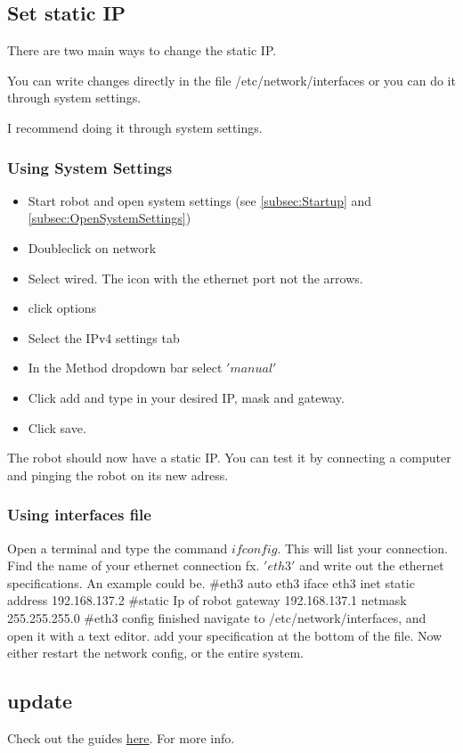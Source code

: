 \documentclass{article}
\begin{document}
\subsection{Set static IP}
There are two main ways to change the static IP. 

You can write changes directly in the file /etc/network/interfaces or you can do it through system settings. 

I recommend doing it through system settings. 

\subsubsection{Using System Settings}
\begin{itemize}
\item Start robot and open system settings (see \ref{subsec:Startup} and \ref{subsec:OpenSystemSettings})
\item Doubleclick on network
\item Select wired. The icon with the ethernet port not the arrows.
\item click options
\item Select the IPv4 settings tab
\item In the Method dropdown bar select $'manual'$ 
\item Click add and type in your desired IP, mask and gateway. 
\item Click save. 
\end{itemize}
The robot should now have a static IP. You can test it by connecting a computer and pinging the robot on its new adress. 

\subsubsection{Using interfaces file}
Open a terminal and type the command $ifconfig$. 
This will list your connection. Find the name of your ethernet connection fx. $'eth3'$ and write out the ethernet specifications. An example could be. 
\#eth3
auto eth3 
iface eth3 inet static 
address 192.168.137.2 \#static Ip of robot
gateway 192.168.137.1 
netmask 255.255.255.0  
\#eth3 config finished
navigate to /etc/network/interfaces, and open it with a text editor. 
add your specification at the bottom of the file.
Now either restart the network config, or the entire system.

\subsection{update}
Check out the guides \href{https://drive.google.com/drive/folders/1e2sAyCd5S1s4jH7FRyMwZzTy7VTZb2NE}{here}. For more info. 
\end{document}
